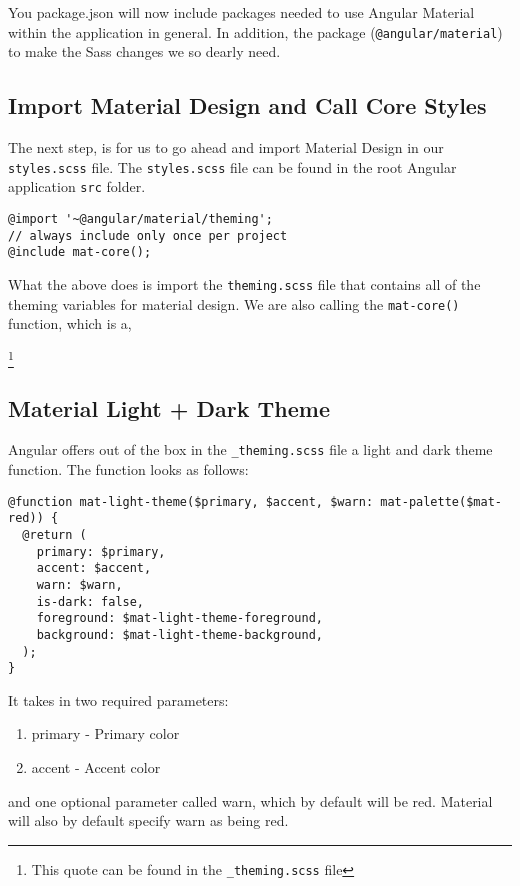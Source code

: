 You package.json will now include packages needed to use Angular Material 
within the application in general. In addition, the package
(\lstinline{@angular/material}) to make the Sass changes we so dearly need. 

\subsection{Import Material Design and Call Core Styles}
The next step, is for us to go ahead and import Material Design in our 
\lstinline{styles.scss} file. The \lstinline{styles.scss} file can be found
in the root Angular application \lstinline{src} folder.

\begin{lstlisting}[caption=styles.scss]
@import '~@angular/material/theming';
// always include only once per project
@include mat-core();
\end{lstlisting}


What the above does is import the \lstinline{theming.scss} file that contains
all of the theming variables for material design. We are also calling the
\lstinline{mat-core()} function, which is a, \begin{quote}
\end{quote} \footnote{This quote can be found in the \lstinline{_theming.scss}
file}

\subsection{Material Light + Dark Theme}
Angular offers out of the box in the \lstinline{_theming.scss} file a light and
dark theme function. The function looks as follows: 
\begin{lstlisting}
@function mat-light-theme($primary, $accent, $warn: mat-palette($mat-red)) {
  @return (
    primary: $primary,
    accent: $accent,
    warn: $warn,
    is-dark: false,
    foreground: $mat-light-theme-foreground,
    background: $mat-light-theme-background,
  );
}  
\end{lstlisting}

It takes in two required parameters: 
\begin{enumerate}
  \item primary - Primary color
  \item accent - Accent color 
\end{enumerate}
and one optional parameter called warn, which by default will be red. Material 
will also by default specify warn as being red. 





